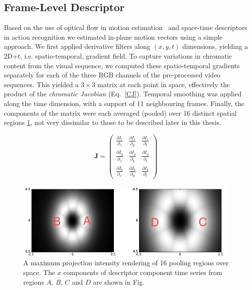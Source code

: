 \subsection{Frame-Level Descriptor}
Based on the use of optical flow in motion estimation~\citep{Weickert2006} and space-time descriptors in action recognition \citep{Wang2009} we estimated in-plane motion vectors using a simple approach.  We first applied derivative filters along $(x,y,t)$ dimensions, yielding a 2D$+t$, i.e. spatio-temporal, gradient field.  To capture variations in chromatic content from the visual sequence, we computed these spatio-temporal gradients separately for each of the three RGB channels of the pre-processed video sequences.  This yielded a $3\times 3$ matrix at each point in space, effectively the product of the \textit{chromatic Jacobian} (Eq.~\ref{CJ}).  Temporal smoothing was applied along the time dimension, with a support of 11 neighbouring frames. Finally, the components of the matrix were each averaged (pooled) over 16 distinct spatial regions \ref{fig:pooling4lwcolor}, not very dissimilar to those to be described later in this thesis. 



\begin{equation}
\mathbf{J} = \left (
\begin{array}{ccc}
\frac{\partial I_r}{\partial_x} & \frac{\partial I_r}{\partial_y}   & \frac{\partial I_r}{\partial_t} \\
\frac{\partial I_g}{\partial_x}   & \frac{\partial I_g}{\partial_y}  &  \frac{\partial I_g}{\partial_t} \\
\frac{\partial I_b}{\partial_x}  & \frac{\partial  I_b}{\partial_y}  &  \frac{\partial I_b}{\partial_t} 
\end{array} 
\right )
\label{eq:CJ}
\end{equation}


\begin{figure}
\centering
\includegraphics[width=\linewidth]{./gfx/Chapter04/pooling_lwcolor.png}
\caption{A maximum projection intensity rendering of 16 pooling regions over space. The $x$ components of descriptor component time series from regions $A$, $B$, $C$ and $D$ are shown in Fig.}
\label{fig:pooling4lwcolor}
\end{figure}


